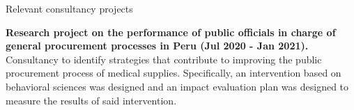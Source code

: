 \documentclass{resume} %
\begin{document}
\begin{rSection}{Relevant consultancy projects}
\item \textbf{Research project on the performance of public officials in charge of general procurement processes in Peru (Jul 2020 - Jan 2021).} {Consultancy to identify strategies that contribute to improving the public procurement process of medical supplies. Specifically, an intervention based on behavioral sciences was designed and an impact evaluation plan was designed to measure the results of said intervention.}


\end{rSection}
\end{document}
